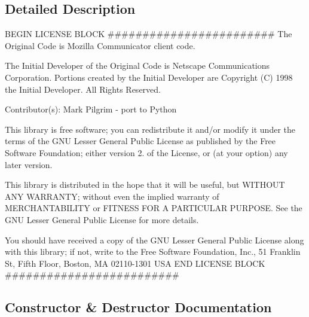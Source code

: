 \subsection{Detailed Description}
B\+E\+G\+IN L\+I\+C\+E\+N\+SE B\+L\+O\+CK \#\#\#\#\#\#\#\#\#\#\#\#\#\#\#\#\#\#\#\#\#\#\#\# The Original Code is Mozilla Communicator client code. 

The Initial Developer of the Original Code is Netscape Communications Corporation. Portions created by the Initial Developer are Copyright (C) 1998 the Initial Developer. All Rights Reserved.

Contributor(s)\+: Mark Pilgrim -\/ port to Python

This library is free software; you can redistribute it and/or modify it under the terms of the G\+NU Lesser General Public License as published by the Free Software Foundation; either version 2. of the License, or (at your option) any later version.

This library is distributed in the hope that it will be useful, but W\+I\+T\+H\+O\+UT A\+NY W\+A\+R\+R\+A\+N\+TY; without even the implied warranty of M\+E\+R\+C\+H\+A\+N\+T\+A\+B\+I\+L\+I\+TY or F\+I\+T\+N\+E\+SS F\+OR A P\+A\+R\+T\+I\+C\+U\+L\+AR P\+U\+R\+P\+O\+SE. See the G\+NU Lesser General Public License for more details.

You should have received a copy of the G\+NU Lesser General Public License along with this library; if not, write to the Free Software Foundation, Inc., 51 Franklin St, Fifth Floor, Boston, MA 02110-\/1301 U\+SA E\+ND L\+I\+C\+E\+N\+SE B\+L\+O\+CK \#\#\#\#\#\#\#\#\#\#\#\#\#\#\#\#\#\#\#\#\#\#\#\#\# 

\subsection{Constructor \& Destructor Documentation}
\mbox{\label{classpip_1_1__vendor_1_1chardet_1_1chardistribution_1_1CharDistributionAnalysis_af6b5a1ec32c8d302689dd98c9f170372}} 
